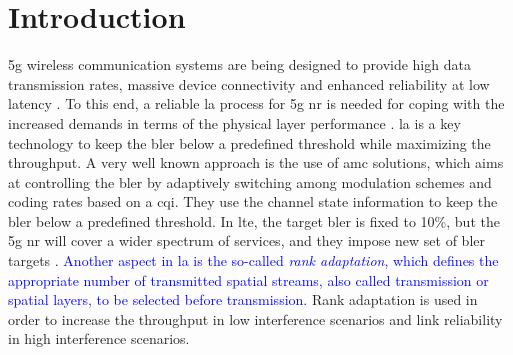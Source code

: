\glsresetall[\acronymtype]
%
\chapter{Introduction} \label{chp:introduction}
\Gls{5g} wireless communication systems are being designed to provide high data transmission rates, massive device connectivity and enhanced reliability at low latency \cite{Amin_2016}.
%
To this end, a reliable \gls{la} process for \gls{5g} \gls{nr} is needed for coping with the increased demands in terms of the physical layer performance \cite{chu01}.
%
\Gls{la} is a key technology to keep the \gls{bler} below a predefined threshold while maximizing the throughput.
%
%
%
A very well known approach is the use of \gls{amc} solutions, which aims at controlling the \gls{bler} by adaptively switching among modulation schemes and coding rates based on a \gls{cqi}.
%
They use the channel state information to keep the \gls{bler} below a predefined threshold.
%
In \gls{lte}, the target \gls{bler} is fixed to 10\%, but the \gls{5g} \gls{nr} will cover a wider spectrum of services, and they impose new set of \gls{bler} targets \cite{Amin_2016,fantacci2009adaptive}.
%
\textcolor{blue}{
Another aspect in \gls{la} is the so-called \textit{rank adaptation}, which defines the appropriate number of transmitted spatial streams, also called transmission or spatial layers, to be selected before transmission.
}
%
Rank adaptation is used in order to increase the throughput in low interference scenarios and link reliability in high interference scenarios.

%
%

